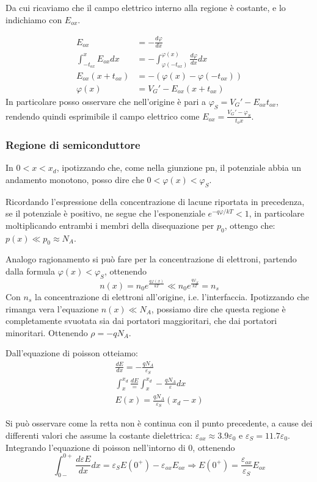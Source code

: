\documentclass[../template]{subfiles}
\begin{document}
Da cui ricaviamo che il campo elettrico interno alla regione è costante, e lo indichiamo con $E_{ox}$.

\begin{align*}
    E_{ox} &= - \frac{d\varphi}{dx}
    \\
    \int_{-t_{ox}}^x E_{ox} {dx} &= - \int_{\varphi(-t_{ox})}^{\varphi(x)} \frac{d\varphi}{dx} dx
    \\
    E_{ox}(x + t_{ox}) &= - (\varphi(x) - \varphi(-t_{ox}))
    \\
    \varphi(x) &= V_G' -E_{ox}(x + t_{ox})
\end{align*}
In particolare posso osservare che nell'origine è pari a $\varphi_S = V_G' - E_{ox}t_{ox}$, rendendo quindi esprimibile il campo elettrico come
$E_{ox} = \frac{V_G' - \varphi_S}{t_ox}$.

\subsubsection{Regione di semiconduttore}
In $0 < x < x_d$, ipotizzando che, come nella giunzione pn, il potenziale abbia un andamento monotono, posso dire che $0 < \varphi(x) < \varphi_S$.

Ricordando l'espressione della concentrazione di lacune riportata in precedenza, se il potenziale è positivo, ne segue che l'esponenziale
$e^{-q\varphi / kT} < 1$, in particolare moltiplicando entrambi i membri della disequazione per $p_0$, ottengo che: $p(x) \ll p_0 \approx N_A$.

Analogo ragionamento si può fare per la concentrazione di elettroni, partendo dalla formula $\varphi(x) < \varphi_S$, ottenendo
\[
    n(x) = n_0 e^\frac{q \varphi(x)}{kT} \ll n_0 e^\frac{q\varphi_S}{kT} = n_s
\]
Con $n_s$ la concentrazione di elettroni all'origine, i.e. l'interfaccia.
Ipotizzando che rimanga vera l'equazione $n(x) \ll N_A$, possiamo dire che questa regione è completamente svuotata sia dai portatori maggioritari, che dai portatori minoritari.
Ottenendo $\rho = -q N_A$.

Dall'equazione di poisson otteiamo:
\begin{align*}
    \frac{dE}{dx} = -\frac{qN_A}{\varepsilon_S}
    \\
    \int_x^{x_d} \frac{dE} = \int_{x}^{x_d} - \frac{qN_A}{\varepsilon}dx
    \\
    E(x) = \frac{q N_A}{\varepsilon_S} (x_d - x)
\end{align*}

Si può osservare come la retta non è continua con il punto precedente, a cause dei differenti valori che assume la costante dielettrica: $\varepsilon_{ox} \approx 3.9 \varepsilon_0$ e $\varepsilon_S = 11.7 \varepsilon_0$.
Integrando l'equazione di poisson nell'intorno di 0, ottenendo
\[
    \int_{0-}^{0+} \frac{d\varepsilon E}{dx} dx = \varepsilon_S E (0^+) - \varepsilon_{ox} E_{ox} \Rightarrow
    E(0^+) = \frac{\varepsilon_{ox}}{\varepsilon_S} E_{ox}
\]
\end{document}
